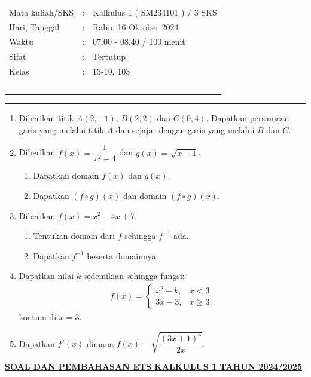 \documentclass[10pt,openany,a4paper]{article}
\theoremstyle{definition}
\theoremstyle{definition}
\theoremstyle{plain}
\begin{document}
    \begin{center}
	\begin{tabular}{lcl}
		Mata kuliah/SKS & : & Kalkulus 1 ( SM234101 ) / 3 SKS\\
		Hari, Tanggal & : & Rabu, 16 Oktober 2024\\
		Waktu & : & 07.00 - 08.40 / 100 menit\\
		Sifat & : & Tertutup\\
		Kelas & : & 13-19, 103\\
  ~
	\end{tabular}

    \noindent\rule{\textwidth}{2.pt}
        \end{center}
    \begin{enumerate}
    \item Diberikan titik $A(2,-1)$, $B(2,2)$ dan $C(0,4)$. Dapatkan persamaan garis yang melalui titik $A$ dan sejajar dengan garis yang melalui $B$ dan $C$.

    \item Diberikan $f(x)=\dfrac{1}{x^2-4}$ dan $g(x)=\sqrt{x+1}$.
    \begin{enumerate}
        \item Dapatkan domain $f(x)$ dan $g(x)$.
        \item Dapatkan $(f\circ g)(x)$ dan domain $(f\circ g)(x)$.
    \end{enumerate}

    \item Diberikan $f(x)=x^2-4x+7$.
    \begin{enumerate}
        \item Tentukan domain dari $f$ sehingga $f^{-1}$ ada.
        \item Dapatkan $f^{-1}$ beserta domainnya.
    \end{enumerate}

    \item Dapatkan nilai $k$ sedemikian sehingga fungsi:
    \begin{align*}
        f(x)=\begin{cases}
            x^2-k, & x<3\\
            3x-3, & x\geq 3.
        \end{cases}
    \end{align*}
    kontinu di $x=3$.

    \item Dapatkan $f'(x)$ dimana $f(x)=\sqrt{\dfrac{(3x+1)^3}{2x}}$.
\end{enumerate}
\newpage
 \begin{center}
	{\underline{\textbf{\MakeUppercase{Soal dan Pembahasan ETS Kalkulus 1 Tahun 2024/2025}}}}
    \end{center}
\end{document}
